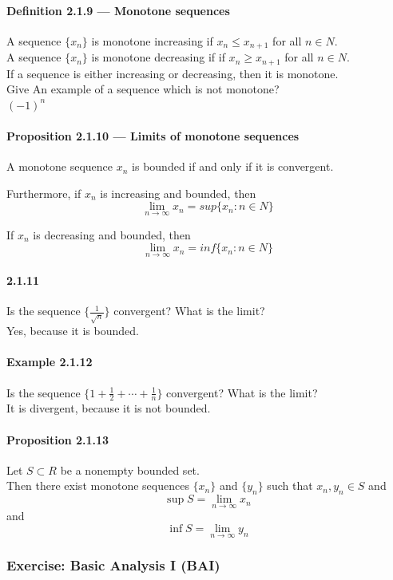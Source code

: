 \documentclass{article}
\begin{document}
\paragraph{Definition 2.1.9 — Monotone sequences}
A sequence $\{x_n\}$ is monotone increasing if $x_n\leq x_{n+1}$ for all $n\in N$.\\
A sequence $\{x_n\}$ is monotone decreasing if if $x_n\geq x_{n+1}$ for all $n\in N$.\\
If a sequence is either increasing or decreasing, then it is monotone.\\
Give An example of a sequence which is not monotone?\\
$(-1)^n$
\paragraph{Proposition 2.1.10 — Limits of monotone sequences}
A monotone sequence $x_n$ is bounded if and only if it is convergent.
\par Furthermore, if $x_n$ is increasing and bounded, then $$\lim_{n\to \infty}x_n=sup\{x_n:n\in N\}$$
\par If $x_n$ is decreasing and bounded, then $$\lim_{n\to \infty}x_n=inf\{x_n:n\in N\}$$
\paragraph{2.1.11}
Is the sequence $\{\frac{1}{\sqrt{n}}\}$ convergent? What is the limit?\\
Yes, because it is bounded.
\paragraph{Example 2.1.12}
Is the sequence $\{1+\frac{1}{2}+\cdots+\frac{1}{n}\}$ convergent? What is the limit?\\
It is divergent, because it is not bounded.
\paragraph{Proposition 2.1.13}
Let $S\subset R$ be a nonempty bounded set.\\
Then there exist monotone sequences $\{x_n\}$ and $\{y_n\}$ such that $x_n,y_n\in S$ and $$\sup S=\lim_{n\to \infty} x_n$$and
$$\inf S=\lim_{n\to \infty}y_n$$
\subsubsection{Exercise: Basic Analysis I (BAI)}
\end{document}
